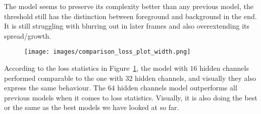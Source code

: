 \documentclass[a4paper,12pt]{article}
\begin{document}
The model seems to preserve its complexity better than any previous model, the threshold still has the distinction between foreground and background in the end. It is still struggling with blurring out in later frames and also overextending its spread/growth.
\begin{figure}[H]
\centering
\texttt{[image: images/comparison\_loss\_plot\_width.png]}
\caption{} %
\label{fig:n24}
\end{figure}
According to the loss statistics in Figure~\ref{fig:n24}, the model with $16$ hidden channels performed comparable to the one with $32$ hidden channels, and visually they also express the same behaviour. The $64$ hidden channels model outperforms all previous models when it comes to loss statistics. Visually, it is also doing the best or the same as the best models we have looked at so far.
\end{document}
